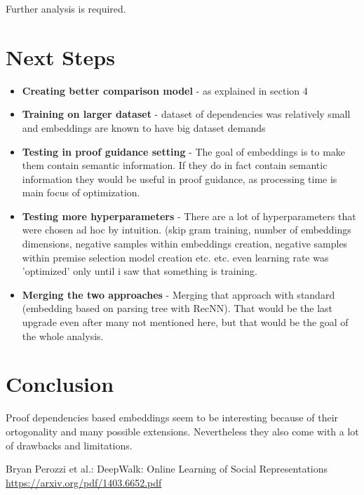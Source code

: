 \documentclass{article} %
\begin{document}
Further analysis is required.


\section{Next Steps}
\begin{itemize}
\item \textbf{Creating better comparison model} - as explained in section 4
\item \textbf{Training on larger dataset} - dataset of dependencies was relatively small and embeddings are known to have big dataset demands 
\item \textbf{Testing in proof guidance setting} - The goal of embeddings is to make them contain semantic information. If they do in fact contain semantic information they would be useful in proof guidance, as processing time is main focus of optimization.
\item \textbf{Testing more hyperparameters} - There are a lot of hyperparameters that were chosen ad hoc by intuition. (skip gram training, number of embeddings dimensions, negative samples within embeddings creation, negative samples within premise selection model creation etc. etc. even learning rate was 'optimized' only until i saw that something is training.
\item \textbf{Merging the two approaches} - Merging that approach with standard (embedding based on parsing tree with RecNN). That would be the last upgrade even after many not mentioned here, but that would be the goal of the whole analysis. 

\end{itemize}

\section{Conclusion}

Proof dependencies based embeddings seem to be interesting because of their ortogonality and many possible extensions. Nevertheless they also come with a lot of drawbacks and limitations.

\begin{thebibliography}{9}
Bryan Perozzi et al.: DeepWalk: Online Learning of Social Representations
\url{https://arxiv.org/pdf/1403.6652.pdf}
\end{thebibliography}
\end{document}
